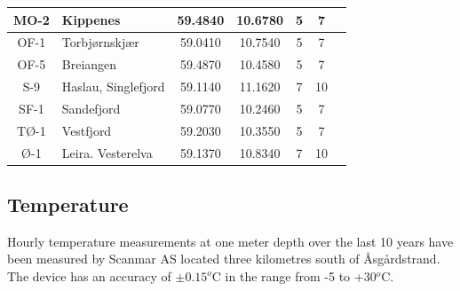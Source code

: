 \begin{table}
\begin{tabular}{|clcccc@{}c|}
MO-2 & Kippenes & 59.4840 & 10.6780 & 5 & 7 &\\ \hline
OF-1 & Torbj{\o}rnskj{\ae}r & 59.0410 & 10.7540 & 5 & 7 &\\ 
OF-5 & Breiangen & 59.4870 & 10.4580 & 5 & 7 &\\ \hline
S-9  & Haslau, Singlefjord & 59.1140 & 11.1620 & 7 & 10 &\\ 
SF-1 & Sandefjord & 59.0770 & 10.2460 & 5 & 7 &\\ \hline
T{\O}-1 & Vestfjord & 59.2030 & 10.3550 & 5 & 7 &\\ 
{\O}-1 & Leira. Vesterelva & 59.1370 & 10.8340 & 7 & 10 &\\ \hline
\end{tabular}
\end{table}



\subsection{Temperature}

Hourly temperature measurements at one meter depth over the last 10 years have been measured by Scanmar AS located three kilometres south of {\AA}sg{\aa}rdstrand. The device has an accuracy of $\pm 0.15^o$C in the range from -5 to +30$^o$C. 





